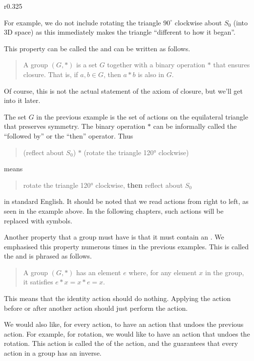 \begin{wrapfigure}{r}{0.325\textwidth}
    \centering
\end{wrapfigure}

For example, we do not include rotating the triangle $90^\circ$ clockwise about $S_0$ (into 3D space) as this immediately makes the triangle ``different to how it began''.

This property can be called the  and can be written as follows.
\begin{quote}
    A group $(G, \ast)$ is a set $G$ together with a binary operation $\ast$ that ensures closure. That is, if $a, b \in G$, then $a \ast b$ is also in $G$.
\end{quote}
Of course, this is not the actual statement of the axiom of closure, but we'll get into it later.

The set $G$ in the previous example is the set of actions on the equilateral triangle that preserves symmetry. The binary operation $\ast$ can be informally called the ``followed by'' or the ``then'' operator. Thus
\begin{quote}
    (reflect about $S_0$) $\ast$ (rotate the triangle 120° clockwise)
\end{quote}
means
\begin{quote}
    rotate the triangle 120° clockwise, \textbf{then} reflect about $S_0$
\end{quote}
in standard English. It should be noted that we read actions from right to left, as seen in the example above. In the following chapters, such actions will be replaced with symbols.

Another property that a group must have is that it must contain an . We emphasised this property numerous times in the previous examples. This is called the  and is phrased as follows.
\begin{quote}
    A group $(G, \ast)$ has an element $e$ where, for any element $x$ in the group, it satisfies $e \ast x = x \ast e = x$.
\end{quote}
This means that the identity action should do nothing. Applying the action before or after another action should just perform the action.

We would also like, for every action, to have an action that undoes the previous action. For example, for rotation, we would like to have an action that undoes the rotation. This action is called the  of the action, and the  guarantees that every action in a group has an inverse.

